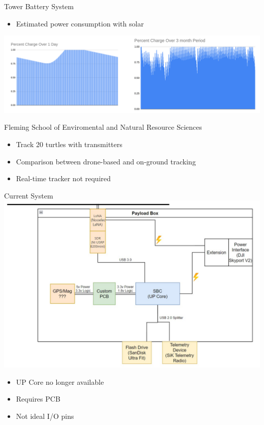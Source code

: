 \begin{frame}{Tower Battery System}
    \begin{itemize}
        \item Estimated power consumption with solar
    \end{itemize}
    \centering
    \includegraphics[height=.7\textheight,width=.7\textwidth,keepaspectratio]{images/rtt/towerBattery.png}
\end{frame}
\begin{frame}{Fleming School of Enviromental and Natural Resource Sciences}
    \begin{itemize}
        \item Track 20 turtles with transmitters
        \item Comparison between drone-based and on-ground tracking
        \item Real-time tracker not required
    \end{itemize}
\end{frame}
\begin{frame}{Current System}
    \centering
    \includegraphics[height=.6\textheight,width=.6\textwidth,keepaspectratio]{images/rtt/oldSystem.jpg}
    \begin{itemize}
        \item UP Core no longer available
        \item Requires PCB
        \item Not ideal I/O pins
    \end{itemize}
\end{frame}
